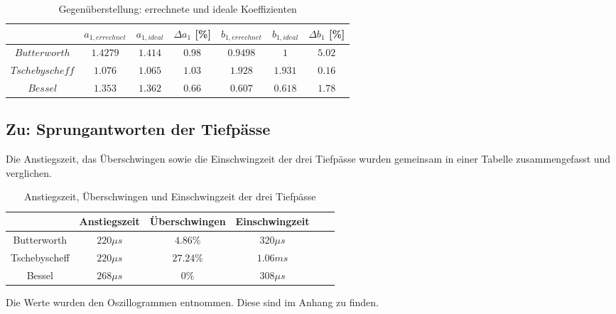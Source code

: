 	\begin{table}[h]
		\centering
		\begin{tabular}{c|c|c|c||c|c|c}
			$ $             & $ a_{1, errechnet} $ & $ a_{1, ideal} $ & $\Delta a_1$ [\%] 
							& $b_{1, errechnet} $ & $ b_{1, ideal} $ & $\Delta b_1$ [\%] \\
			\hline	
			$Butterworth$   & $1.4279$             & $1.414$          & $0.98$            
			                & $0.9498$             & $1$              & $5.02$  \\ 	  	
			\hline
			$Tschebyscheff$ & $1.076$              & $1.065$          & $1.03$ 
			                & $1.928$              & $1.931$          & $0.16$  \\  
			\hline
			$ Bessel$ 		& $1.353$	           & $1.362$          & $0.66$  
			                & $0.607$              & $0.618$		  & $1.78$
		\end{tabular}
		\caption{Gegenüberstellung: errechnete und ideale Koeffizienten }
		\label{tab:koeffizienten}
	\end{table}
	
\newpage

\subsection{Zu: Sprungantworten der Tiefpässe}
\noindent Die Anstiegszeit, das Überschwingen sowie die Einschwingzeit der drei Tiefpässe wurden gemeinsam in einer Tabelle zusammengefasst und verglichen.

\begin{table}[h]
	\centering
	\begin{tabular}{c|c|c|c|c|c}
						& Anstiegszeit 	& Überschwingen	& Einschwingzeit  \\
		\hline
		Butterworth		& $220\mu s$	& $4.86\%$		& $320\mu s$ \\
		\hline
		Tschebyscheff	& $220\mu s$	& $27.24\%$		& $1.06ms$   \\
		\hline
		Bessel			& $268\mu s$	& $0\%$			& $308\mu s$ \\
	\end{tabular}
	\caption{Anstiegszeit, Überschwingen und Einschwingzeit der drei Tiefpässe}
	\label{tab:sprungantworten_tp}
\end{table}

\noindent Die Werte wurden den Oszillogrammen entnommen. Diese sind im Anhang zu finden.


